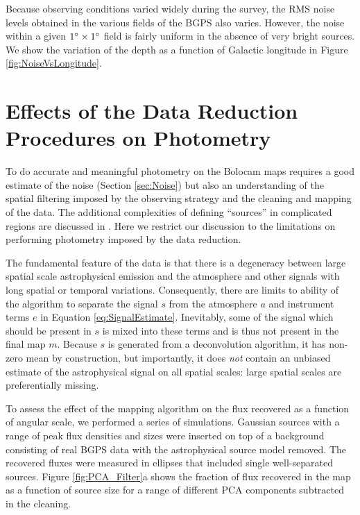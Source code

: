 \documentclass{emulateapj}
\begin{document}
Because observing conditions varied widely during the survey, the RMS
noise levels obtained in the various fields of the BGPS also varies.
However, the noise within a given $1\mbox{$^\circ$} \times 1\mbox{$^\circ$}$ field is
fairly uniform in the absence of very bright sources.  We show the
variation of the depth as a function of Galactic longitude in Figure
\ref{fig:NoiseVsLongitude}.

\section{Effects of the Data Reduction Procedures on Photometry}
\label{sec:Photometry}

To do accurate and meaningful photometry on the Bolocam maps requires
a good estimate of the noise (Section \ref{sec:Noise}) but also an
understanding of the spatial filtering imposed by the observing
strategy and the cleaning and mapping of the data.  The additional
complexities of defining ``sources'' in complicated regions are
discussed in \citet{rosolowsky09}.  Here we restrict our discussion to
the limitations on performing photometry imposed by the data
reduction.

The fundamental feature of the data is that there is a degeneracy
between large spatial scale astrophysical emission and the atmosphere
and other signals with long spatial or temporal variations.
Consequently, there are limits to ability of the algorithm to separate
the signal $s$ from the atmosphere $a$ and instrument terms $e$ in
Equation \ref{eq:SignalEstimate}.  Inevitably, some of the signal
which should be present in $s$ is mixed into these terms and is thus
not present in the final map $m$.  Because $s$ is generated from a
deconvolution algorithm, it has non-zero mean by construction, but
importantly, it does {\it not} contain an unbiased estimate of the
astrophysical signal on all spatial scales: large spatial scales are
preferentially missing.

To assess the effect of the mapping algorithm on the flux recovered as
a function of angular scale, we performed a series of simulations.
Gaussian sources with a range of peak flux densities and sizes were
inserted on top of a background consisting of real BGPS data with the
astrophysical source model removed.  The recovered fluxes were
measured in ellipses that included single well-separated sources.
Figure \ref{fig:PCA_Filter}a shows the fraction of flux recovered in
the map as a function of source size for a range of different PCA
components subtracted in the cleaning.
\end{document}
